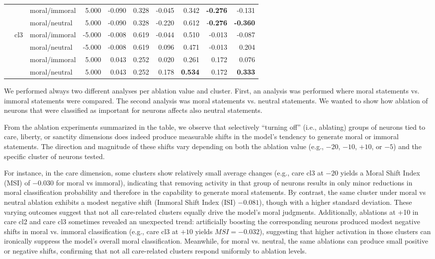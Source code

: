 \documentclass[runninghheads]{llncs}
\begin{document}
\begin{table}[!ht]
\begin{tabular}{|l|l|l|r|r|r|r|r|r|r|}
         &  & moral/immoral & 5.000 & -0.090 & 0.328 & -0.045 & 0.342 & \textbf{-0.276} & -0.131 \\ 
         &  & moral/neutral & 5.000 & -0.090 & 0.328 & -0.220 & 0.612 & -\textbf{0.276} & \textbf{-0.360} \\ 
         \cline{2-10}       
         & \multirow{4}{*}{cl3} & moral/immoral & -5.000 & -0.008 & 0.619 & -0.044 & 0.510 & -0.013 & -0.087 \\ 
         &  & moral/neutral & -5.000 & -0.008 & 0.619 & 0.096 & 0.471 & -0.013 & 0.204 \\ 
         &  & moral/immoral & 5.000 & 0.043 & 0.252 & 0.020 & 0.261 & 0.172 & 0.076 \\ 
         &  & moral/neutral & 5.000 & 0.043 & 0.252 & 0.178 & \textbf{0.534} & 0.172 & \textbf{0.333} \\ 
         \hline
    \end{tabular}
    \endgroup
\end{table}


We performed always two different analyses per ablation value and cluster. First, an analysis was performed where moral statements vs. immoral statements were compared. The second analysis was moral statements vs. neutral statements. We wanted to show how ablation of neurons that were classified as important for neurons affects also neutral statements.

From the ablation experiments summarized in the table, we observe that selectively “turning off” (i.e., ablating) groups of neurons tied to care, liberty, or sanctity dimensions does indeed produce measurable shifts in the model’s tendency to generate moral or immoral statements. The direction and magnitude of these shifts vary depending on both the ablation value (e.g., $-20$, $-10$, $+10$, or $-5$) and the specific cluster of neurons tested.

For instance, in the care dimension, some clusters show relatively small average changes (e.g., care cl3 at $-20$ yields a Moral Shift Index (MSI) of $-0.030$ for moral vs immoral), indicating that removing activity in that group of neurons results in only minor reductions in moral classification probability and therefore in the capability to generate moral statements. By contrast, the same cluster under moral vs neutral ablation exhibits a modest negative shift (Immoral Shift Index (ISI) $-0.081$), though with a higher standard deviation. These varying outcomes suggest that not all care-related clusters equally drive the model’s moral judgments. Additionally, ablations at +10 in care cl2 and care cl3 sometimes revealed an unexpected trend: artificially boosting the corresponding neurons produced modest negative shifts in moral vs. immoral classification (e.g., care cl3 at $+10$ yields $MSI=-0.032$), suggesting that higher activation in those clusters can ironically suppress the model’s overall moral classification. Meanwhile, for moral vs. neutral, the same ablations can produce small positive or negative shifts, confirming that not all care-related clusters respond uniformly to ablation levels.
\end{document}
